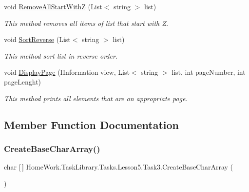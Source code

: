 \begin{DoxyCompactItemize}
void \mbox{\hyperlink{class_home_work_1_1_task_library_1_1_tasks_1_1_lesson5_1_1_task3_afb2f1efe2dfbd4558fb0d5b7426cff6a}{Remove\+All\+Start\+WithZ}} (List$<$ string $>$ list)
\begin{DoxyCompactList}\small\item\em This method removes all items of list that start with \textquotesingle{}Z\textquotesingle{}. \end{DoxyCompactList}\item 
void \mbox{\hyperlink{class_home_work_1_1_task_library_1_1_tasks_1_1_lesson5_1_1_task3_a1be1e63e01ab46baac3ecb8fd24e93bf}{Sort\+Reverse}} (List$<$ string $>$ list)
\begin{DoxyCompactList}\small\item\em This method sort list in reverse order. \end{DoxyCompactList}\item 
void \mbox{\hyperlink{class_home_work_1_1_task_library_1_1_tasks_1_1_lesson5_1_1_task3_a40c5073986f1829ab38be1904260f242}{Display\+Page}} (I\+Information view, List$<$ string $>$ list, int page\+Number, int page\+Lenght)
\begin{DoxyCompactList}\small\item\em This method prints all elements that are on appropriate page. \end{DoxyCompactList}\end{DoxyCompactItemize}


\subsection{Member Function Documentation}
\mbox{\label{class_home_work_1_1_task_library_1_1_tasks_1_1_lesson5_1_1_task3_a6a9221a32dccd837a0f9f38ad8a5fb50}} 
\subsubsection{\texorpdfstring{CreateBaseCharArray()}{CreateBaseCharArray()}}
{\footnotesize\ttfamily char \mbox{[}$\,$\mbox{]} Home\+Work.\+Task\+Library.\+Tasks.\+Lesson5.\+Task3.\+Create\+Base\+Char\+Array (\begin{DoxyParamCaption}{ }\end{DoxyParamCaption})\hspace{0.3cm}{\ttfamily [private]}}



